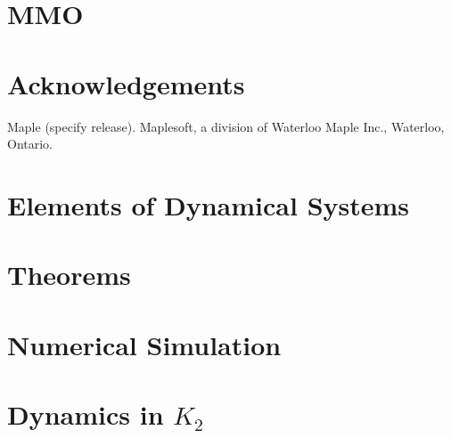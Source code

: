 \documentclass{article}
\begin{document}
\section{MMO}\label{sec: MMO Oscilaltions}



\section{Acknowledgements}
Maple (specify release). Maplesoft, a division of Waterloo Maple Inc., Waterloo, Ontario.
\newpage


\nocite{strogatz2007nonlinear}

\newpage
\appendix
\section{Elements of Dynamical Systems}\label{app:DynSys}

\section{Theorems}

%
\section{Numerical Simulation}\label{app:NumSim}

\section{Dynamics in \texorpdfstring{$K_2$}{K2}}
\end{document}

